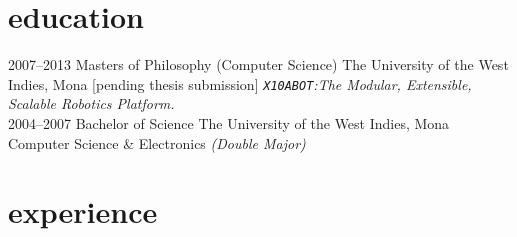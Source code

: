 \documentclass[]{friggeri-cv} %
\begin{document}

\section{education}

\begin{entrylist}
\entry
{2007--2013}
{Masters {\normalfont of Philosophy (Computer Science)}}
{The University of the West Indies, Mona [pending thesis submission]}
{\emph{\texttt{X10ABOT}:The Modular, Extensible, Scalable Robotics Platform.}} \\ 
\entry
{2004--2007}
{Bachelor {\normalfont of Science}}
{The University of the West Indies, Mona}
{Computer Science \& Electronics \emph{(Double Major)}}
\end{entrylist}


\section{experience}
\end{document}

